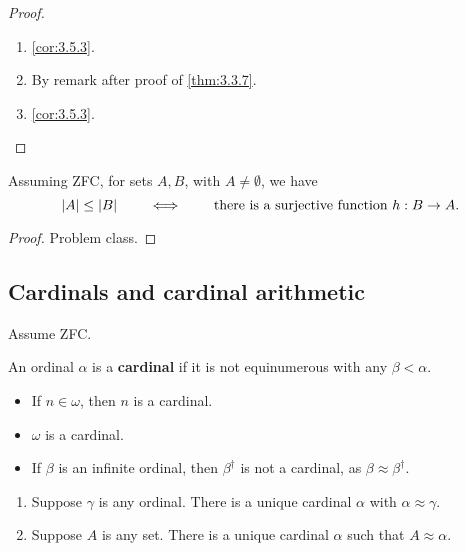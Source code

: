\begin{proof}
\hfill
\begin{enumerate}
\item \ref{cor:3.5.3}.
\item By remark after proof of \ref{thm:3.3.7}.
\item \ref{cor:3.5.3}.
\end{enumerate}
\end{proof}

\begin{lemma}
\label{lem:4.1.7}
Assuming ZFC, for sets $ A, B $, with $ A \ne \emptyset $, we have
$$ \left\lvert A \right\rvert \le \left\lvert B \right\rvert \qquad \iff \qquad \text{there is a surjective function} \ h : B \to A. $$
\end{lemma}

\begin{proof}
Problem class.
\end{proof}

\pagebreak

\subsection{Cardinals and cardinal arithmetic}

Assume ZFC.

\begin{definition}
An ordinal $ \alpha $ is a \textbf{cardinal} if it is not equinumerous with any $ \beta < \alpha $.
\end{definition}

\begin{example2}
\hfill
\begin{itemize}
\item If $ n \in \omega $, then $ n $ is a cardinal.
\item $ \omega $ is a cardinal.
\item If $ \beta $ is an infinite ordinal, then $ \beta^\dagger $ is not a cardinal, as $ \beta \approx \beta^\dagger $.
\end{itemize}
\end{example2}

\begin{lemma}
\hfill
\begin{enumerate}
\item Suppose $ \gamma $ is any ordinal. There is a unique cardinal $ \alpha $ with $ \alpha \approx \gamma $.
\item Suppose $ A $ is any set. There is a unique cardinal $ \alpha $ such that $ A \approx \alpha $.
\end{enumerate}
\end{lemma}


